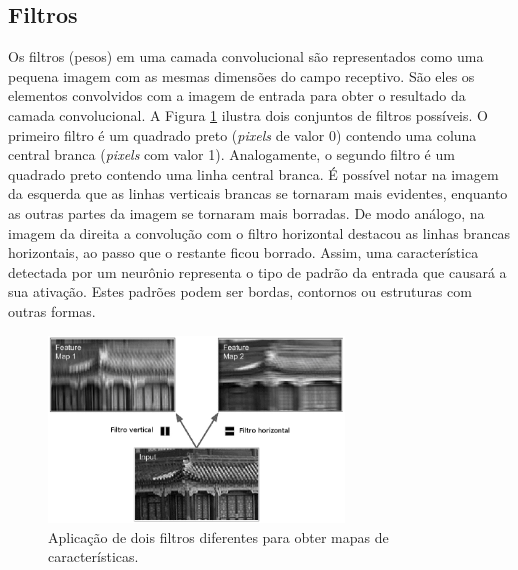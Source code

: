 \subsection{Filtros}
Os filtros (pesos) em uma camada convolucional são representados como uma pequena
imagem com as mesmas dimensões do campo receptivo. São eles os elementos
convolvidos com a imagem de entrada para obter o resultado da camada convolucional.
A Figura \ref{fig:conv_filt} ilustra dois conjuntos de filtros possíveis. O primeiro filtro é um quadrado preto
(\textit{pixels} de valor 0) contendo uma coluna central branca (\textit{pixels} com valor 1). 
Analogamente, o segundo filtro é um quadrado preto contendo uma linha central branca.
É possível notar na imagem da esquerda que as linhas verticais brancas se tornaram mais
evidentes, enquanto as outras partes da imagem se tornaram mais borradas. De modo análogo, na imagem da direita 
a convolução com o filtro horizontal destacou as linhas brancas horizontais, ao passo que
o restante ficou borrado. Assim, uma característica detectada por um neurônio representa
o tipo de padrão da entrada que causará a sua ativação.
Estes padrões podem ser bordas, contornos ou estruturas com outras formas.
\begin{figure}[htp]
\begin{center}
  \includegraphics[width=0.7\textwidth]{fig/conv_filt}
  \caption{Aplicação de dois filtros diferentes para obter mapas de características.}
  \label{fig:conv_filt}
\end{center}
\end{figure}

